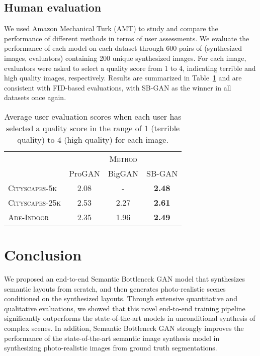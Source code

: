 \documentclass[10pt,twocolumn,letterpaper]{article}
\begin{document}
{\subsection{Human evaluation}
We used Amazon Mechanical Turk (AMT) to study and compare the performance of different methods in terms of user assessments. We evaluate the performance of each model on each dataset through 600 pairs of (synthesized images, evaluators) containing 200 unique synthesized images. For each image, evaluators were asked to select a quality score from 1 to 4, indicating terrible and high quality images, respectively. Results are summarized in Table~\ref{table:userstudy} and are consistent with FID-based evaluations, with SB-GAN as the winner in all datasets once again.




\begin{table}[h]
\setlength{\tabcolsep}{5pt}
\setlength{\extrarowheight}{5pt}
\renewcommand{\arraystretch}{0.75}
\centering
\begin{tabular}{lccc}
\toprule
& \multicolumn{3}{c}{\textsc{Method}} \\ \cmidrule{2-4}
& ProGAN & BigGAN & SB-GAN \\ \midrule
\textsc{Cityscapes-5k}     & 2.08 & - & \textbf{2.48} \\
\textsc{Cityscapes-25k}    & 2.53 & 2.27 & \textbf{2.61} \\
\textsc{Ade-Indoor}        & 2.35 & 1.96 & \textbf{2.49} \\
\bottomrule
\end{tabular}
\vspace{2mm}
\caption{Average user evaluation scores when each user has selected a quality score in the range of 1 (terrible quality) to 4 (high quality) for each image.}
\label{table:userstudy}
\vspace{-2mm}
\end{table}

\vspace{-1mm}
\section{Conclusion}
We proposed an end-to-end Semantic Bottleneck GAN model that synthesizes semantic layouts from scratch, and then generates photo-realistic scenes conditioned on the synthesized layouts. Through extensive quantitative and qualitative evaluations, we showed that this novel end-to-end training pipeline significantly outperforms the state-of-the-art models in unconditional synthesis of complex scenes. In addition, Semantic Bottleneck GAN strongly improves the performance of the state-of-the-art semantic image synthesis model in synthesizing photo-realistic images from ground truth segmentations.

}
\end{document}
